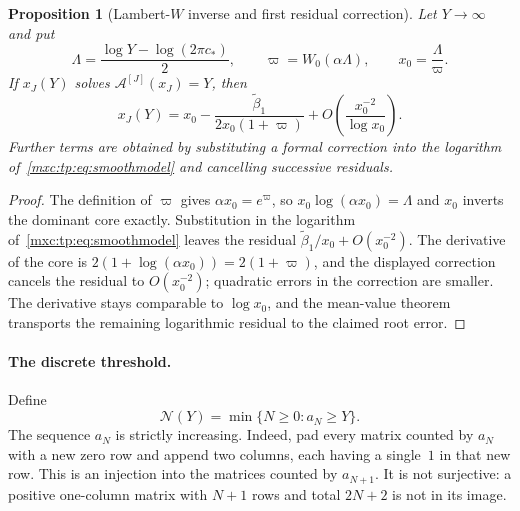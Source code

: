 \documentclass[11pt]{article}
\numberwithin{equation}{section}
\newtheorem{proposition}[theorem]{Proposition}
\theoremstyle{definition}
\theoremstyle{remark}
\begin{document}
\begin{proposition}[Lambert-$W$ inverse and first residual correction]\label{mxc:tp:prop:inverse}
Let $Y\to\infty$ and put
\begin{equation}\label{mxc:tp:eq:inversecore}
 \Lambda=\frac{\log Y-\log(2\pi c_*)}2,\qquad
 \varpi=W_0(\alpha\Lambda),\qquad x_0=\frac\Lambda\varpi.
\end{equation}
If $x_J(Y)$ solves $\mathcal A^{[J]}(x_J)=Y$, then
\begin{equation}\label{mxc:tp:eq:inversecorrection}
 x_J(Y)=x_0-\frac{\widetilde\beta_1}{2x_0(1+\varpi)}
 +O\!\left(\frac{x_0^{-2}}{\log x_0}\right).
\end{equation}
Further terms are obtained by substituting a formal correction into the
logarithm of~\eqref{mxc:tp:eq:smoothmodel} and cancelling successive
residuals.
\end{proposition}
\begin{proof}
The definition of $\varpi$ gives $\alpha x_0=e^{\varpi}$, so
$x_0\log(\alpha x_0)=\Lambda$ and $x_0$ inverts the dominant core exactly.
Substitution in the logarithm of~\eqref{mxc:tp:eq:smoothmodel} leaves the
residual $\widetilde\beta_1/x_0+O(x_0^{-2})$. The derivative of the core
is $2(1+\log(\alpha x_0))=2(1+\varpi)$, and the displayed correction
cancels the residual to $O(x_0^{-2})$; quadratic errors in the correction
are smaller. The derivative stays comparable to $\log x_0$, and the
mean-value theorem transports the remaining logarithmic residual to the
claimed root error.
\end{proof}

\paragraph{The discrete threshold.} Define
\begin{equation}\label{mxc:tp:eq:threshold}
 \mathcal N(Y)=\min\{N\ge0:a_N\ge Y\}.
\end{equation}
The sequence $a_N$ is strictly increasing. Indeed, pad every matrix
counted by $a_N$ with a new zero row and append two columns, each having a
single~$1$ in that new row. This is an injection into the matrices counted
by $a_{N+1}$. It is not surjective: a positive one-column matrix with
$N+1$ rows and total $2N+2$ is not in its image.
\end{document}
